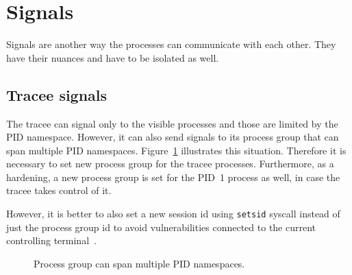 \documentclass[en]{pracamgr}
\begin{document}
\section{Signals}

Signals are another way the processes can communicate with each other. They have their nuances and have to be isolated as well.

\subsection{Tracee signals}

The tracee can signal only to the visible processes and those are limited by the PID namespace. However, it can also send signals to its process group that can span multiple PID namespaces. Figure~\ref{fig:pgid_and_pid_namespace} illustrates this situation. Therefore it is necessary to set new process group for the tracee processes. Furthermore, as a hardening, a new process group is set for the PID~1 process as well, in case the tracee takes control of it.

However, it is better to also set a new session id using \texttt{setsid} syscall instead of just the process group id to avoid vulnerabilities connected to the current controlling terminal~\cite{bubblewrap_cve}.

\begin{figure}[h]
\tikzset{>=latex} %
\centering
{}
\caption{Process group can span multiple PID namespaces.}
\label{fig:pgid_and_pid_namespace}
\end{figure}
\end{document}
